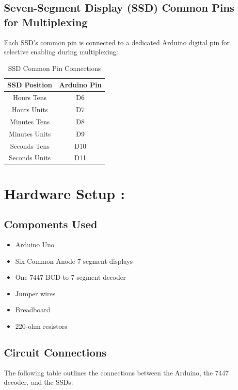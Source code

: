 \documentclass[12pt]{article}
\begin{document}
	\subsection{Seven-Segment Display (SSD) Common Pins for Multiplexing}
	Each SSD's common pin is connected to a dedicated Arduino digital pin for selective enabling during multiplexing:
	\begin{table}[h]
		\centering
		\begin{tabular}{|c|c|}
			\hline
			\textbf{SSD Position} & \textbf{Arduino Pin} \\
			\hline
			Hours Tens & D6 \\
			Hours Units & D7 \\
			Minutes Tens & D8 \\
			Minutes Units & D9 \\
			Seconds Tens & D10 \\
			Seconds Units & D11 \\
			\hline
		\end{tabular}
		\caption{SSD Common Pin Connections}
	\end{table}
	
	\section{Hardware Setup : }
	\subsection{Components Used}
	\begin{itemize}
		\item Arduino Uno
		\item Six Common Anode 7-segment displays
		\item One 7447 BCD to 7-segment decoder
		\item Jumper wires
		\item Breadboard
		\item 220-ohm resistors
	\end{itemize}
	\newpage
	\subsection{Circuit Connections}
	The following table outlines the connections between the Arduino, the 7447 decoder, and the SSDs:
	
\end{document}
